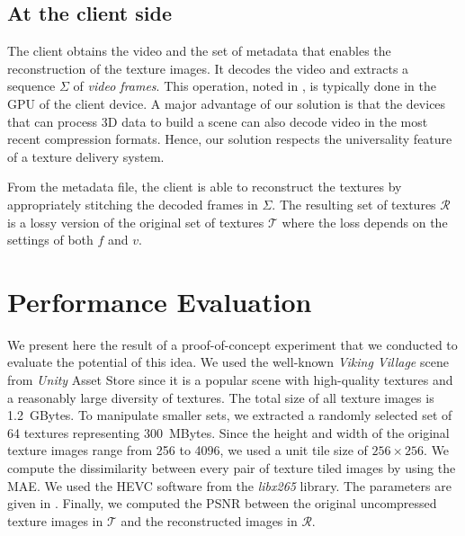 \documentclass{vgtc}                          %
\begin{document}
\subsection{At the client side}

 The client obtains the video and the set of metadata that enables the reconstruction of the texture images. It decodes the video and extracts a sequence $\Sigma$ of \emph{video frames}. This operation, noted  in , is typically done in the \gls{GPU} of the client device. A major advantage of our solution is that the devices that can process 3D data to build a scene can also decode video in the most recent compression formats. Hence, our solution respects the universality feature of a texture delivery system.

 From the metadata file, the client is able to reconstruct the textures by appropriately stitching the decoded frames in $\Sigma$. The resulting set of textures $\mathcal R$ is a lossy version of the original set of textures $\mathcal T$ where the loss depends on the settings of both $f$ and $v$.

\section{Performance Evaluation}
\label{sec:performance}

We present here the result of a proof-of-concept experiment that we conducted to evaluate the potential of this idea. We used the well-known \emph{Viking Village} scene from \emph{Unity} Asset Store since it is a popular scene with high-quality textures and a reasonably large diversity of textures. The total size of all texture images is \SI{1.2}{\giga Bytes}. To manipulate smaller sets, we extracted a randomly selected set of \num{64} textures representing \SI{300}{\mega Bytes}.
 Since the height and width of the original texture images range from \num{256} to \num{4096}, we used a unit tile size of $\num{256}\times\num{256}$. We compute the dissimilarity between every pair of texture tiled images by using the \gls{MAE}. We used the \gls{HEVC} software from the \emph{libx265} library. The parameters are given in . Finally, we computed the \gls{PSNR} between the original uncompressed texture images in $\mathcal T$ and the reconstructed images in $\mathcal R$.
\end{document}

